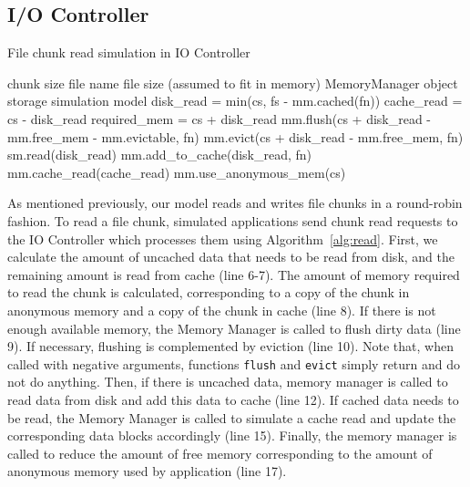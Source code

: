\documentclass[conference]{IEEEtran}
\newcommand{\Desc}[2]{\State \makebox[2em][l]{#1}#2}
\begin{document}
    \subsection{I/O Controller}
     
    \begin{algorithm}\caption{File chunk read simulation in IO Controller}
    \label{alg:read}
        \small
        \begin{algorithmic}[1]
            \Input
                \Desc{cs}{chunk size}
                \Desc{fn}{file name}
                \Desc{fs}{file size (assumed to fit in memory)}
                \Desc{mm}{MemoryManager object}
                \Desc{sm}{storage simulation model}
               \EndInput
               \State disk\_read = min(cs, fs - mm.cached(fn)) 
               \State cache\_read = cs - disk\_read 
               \State required\_mem = cs + disk\_read
               \State mm.flush(cs + disk\_read - mm.free\_mem - mm.evictable, fn) 
               \State mm.evict(cs + disk\_read - mm.free\_mem, fn) 
                     
               \State sm.read(disk\_read)  
               \State mm.add\_to\_cache(disk\_read, fn)     
               \EndIf
                
               \State mm.cache\_read(cache\_read)  
            \EndIf
            \State mm.use\_anonymous\_mem(cs)
        \end{algorithmic}
    \end{algorithm}
    As mentioned previously, our model reads and writes file chunks in a
    round-robin fashion. To read a file chunk, simulated applications send
    chunk read requests to the IO Controller which processes them using
    Algorithm~\ref{alg:read}. First, we calculate the amount of uncached
    data that needs to be read from disk, and the remaining amount is read
    from cache (line 6-7). The amount of memory required to read the chunk
    is calculated, corresponding to a copy of the chunk in anonymous memory
    and a copy of the chunk in cache (line 8). 
    If there is not enough available memory, the Memory Manager is called
    to flush dirty data (line 9). If necessary, flushing is complemented by
    eviction (line 10). Note that, when called with negative arguments, functions
    \texttt{flush} and \texttt{evict} simply return and do not do anything. Then, if there is
    uncached data, memory manager is called to read data from disk and add this 
    data to cache (line 12).
    If cached data needs to be read, the Memory Manager is called to simulate 
    a cache read  and update the corresponding data blocks accordingly (line 15).
    Finally, the memory manager is called to reduce the amount of free memory 
    corresponding to the amount of anonymous memory used by application (line 17).
\end{document}
